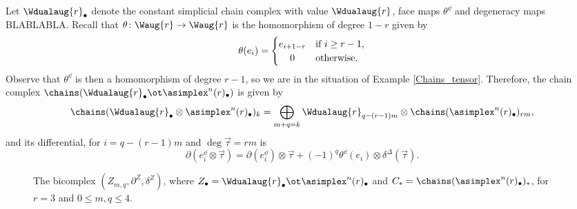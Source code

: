 \begin{example}
Let $\Wdualaug{r}_\bullet$ denote the constant simplicial chain complex with value $\Wdualaug{r}$, face maps $\theta^\dd$ and degeneracy maps BLABLABLA. Recall that $\theta\colon \Waug{r}\to\Waug{r}$ is the homomorphism of degree $1-r$ given by
\begin{align*}
\theta(e_i) = \begin{cases} e_{i+1-r} & \text{if $i\geq r-1$,} \\ \hfil0 & \text{otherwise.} \end{cases}%
\end{align*}
Observe that $\theta^\dd$ is then a homomorphism of degree $r-1$, so we are in the situation of Example \ref{Chains_tensor}. Therefore, the chain complex $\chains(\Wdualaug{r}_\bullet\ot\asimplex^n(r)_\bullet)$ is given by
\[
\chains(\Wdualaug{r}_\bullet\otimes\asimplex^n(r)_\bullet)_k=\bigoplus_{m+q=k}\Wdualaug{r}_{q-(r-1)m}\otimes\chains(\asimplex^n(r)_\bullet)_{rm},
\]
and its differential, for $i=q-(r-1)m$ and $\deg \vec\tau=rm$ is
\[
\partial(e_i^\dd\otimes \vec{\tau}) = \partial(e_i^\dd)\otimes \vec{\tau} + (-1)^q\theta^\dd(e_i)\otimes \delta^\Delta(\vec{\tau}).
\]

\begin{figure}[ht!]
	
	\caption{The bicomplex $(Z_{m,q},\partial^Z,\delta^Z)$, where $Z_\bullet=\Wdualaug{r}_\bullet\ot\asimplex^n(r)_\bullet$ and $C_*=\chains(\asimplex^n(r)_\bullet)_*$,  for $r=3$ and $0\leq m,q\leq 4$.}
\end{figure}
\end{example}




